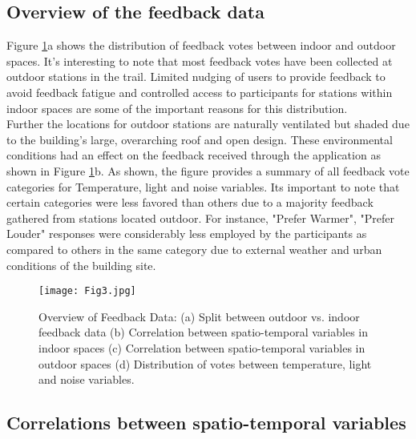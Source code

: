 


\subsection{Overview of the feedback data}

Figure \ref{fig:feedbackdata}a shows the distribution of feedback votes between indoor and outdoor spaces. It's interesting to note that most feedback votes have been collected at outdoor stations in the trail. Limited nudging of users to provide feedback to avoid feedback fatigue \cite{EffectsFeedbackFatigue} and controlled access to participants for stations within indoor spaces are some of the important reasons for this distribution.\\


Further the locations for outdoor stations are naturally ventilated but shaded due to the building's large, overarching roof and open design. These environmental conditions had an effect on the feedback received through the application as shown in Figure \ref{fig:feedbackdata}b.  As shown, the figure provides a summary of all feedback vote categories for Temperature, light and noise variables. Its important to note that certain categories were less favored than others due to a majority feedback gathered from stations located outdoor. For instance, "Prefer Warmer", "Prefer Louder" responses were considerably less employed by the participants as compared to others in the same category due to external weather and urban conditions of the building site.\\    


\begin{figure}
\begin{center}
\texttt{[image: Fig3.jpg]}
\caption{Overview of Feedback Data: (a) Split between outdoor vs. indoor feedback data (b) Correlation between spatio-temporal variables in indoor spaces (c) Correlation between spatio-temporal variables in outdoor spaces (d) Distribution of votes between temperature, light and noise variables.}
\label{fig:feedbackdata}
\end{center}
\end{figure}


\subsection{Correlations between spatio-temporal variables}

